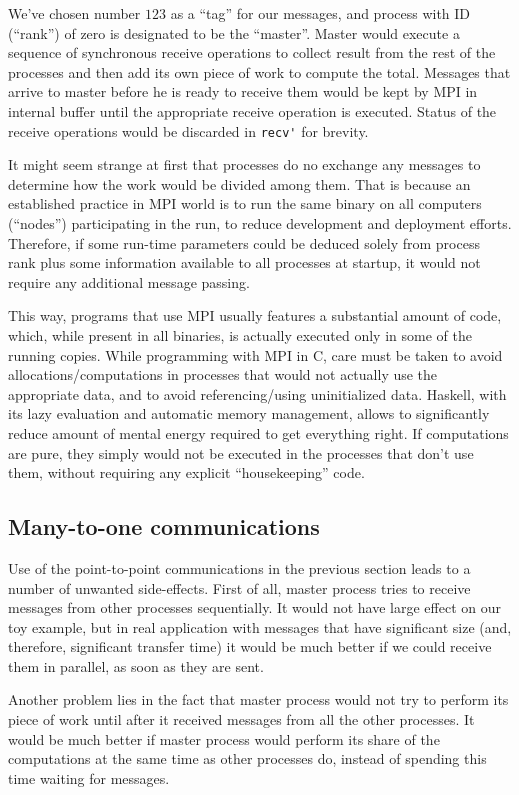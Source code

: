 \documentclass{tmr}
\begin{document}
We've chosen number $123$ as a ``tag'' for our messages, and process
with ID (``rank'') of zero is designated to be the ``master''. Master
would execute a sequence of synchronous receive operations to collect
result from the rest of the processes and then add its own piece of
work to compute the total. Messages that arrive to master before he is
ready to receive them would be kept by MPI in internal buffer until
the appropriate receive operation is executed. Status of the receive
operations would be discarded in \verb|recv'| for brevity.

It might seem strange at first that processes do no exchange any
messages to determine how the work would be divided among them. That is
because an established practice in MPI world is to run the same binary
on all computers (``nodes'') participating in the run, to reduce
development and deployment efforts. Therefore, if some run-time
parameters could be deduced solely from process rank plus
some information available to all processes at startup, it would not
require any additional message passing.

This way, programs that use MPI usually features a substantial amount of code,
which, while present in all binaries, is actually executed only in
some of the running copies. While programming with MPI in C, care must
be taken to avoid allocations/computations in processes that would not
actually use the appropriate data, and to avoid referencing/using
uninitialized data. Haskell, with its lazy evaluation and automatic
memory management, allows to significantly reduce amount of mental
energy required to get everything right. If computations are pure,
they simply would not be executed in the processes that don't use
them, without requiring any explicit ``housekeeping'' code.

\subsection{Many-to-one communications}

Use of the point-to-point communications in the previous section leads
to a number of unwanted side-effects. First of all, master process
tries to receive messages from other processes sequentially. It would
not have large effect on our toy example, but in real application with
messages that have significant size (and, therefore, significant
transfer time) it would be much better if we could receive them in
parallel, as soon as they are sent. 

Another problem lies in the fact that master process would not try to
perform its piece of work until after it received messages from all
the other processes. It would be much better if master process would
perform its share of the computations at the same time as other
processes do, instead of spending this time waiting for messages.
\end{document}
